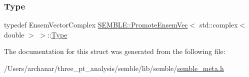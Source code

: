 \mbox{\label{structSEMBLE_1_1PromoteEnsemVec_3_01std_1_1complex_3_01double_01_4_01_4_a515e76ac6ae88273e5df1c2ace1c7046}} 
\subsubsection{\texorpdfstring{Type}{Type}\hspace{0.1cm}{\footnotesize\ttfamily [2/2]}}
{\footnotesize\ttfamily typedef Ensem\+Vector\+Complex \mbox{\hyperlink{structSEMBLE_1_1PromoteEnsemVec}{S\+E\+M\+B\+L\+E\+::\+Promote\+Ensem\+Vec}}$<$ std\+::complex$<$ double $>$ $>$\+::\mbox{\hyperlink{structSEMBLE_1_1PromoteEnsemVec_3_01std_1_1complex_3_01double_01_4_01_4_a515e76ac6ae88273e5df1c2ace1c7046}{Type}}}



The documentation for this struct was generated from the following file\+:\begin{DoxyCompactItemize}
\item 
/\+Users/archanar/three\+\_\+pt\+\_\+analysis/semble/lib/semble/\mbox{\hyperlink{lib_2semble_2semble__meta_8h}{semble\+\_\+meta.\+h}}\end{DoxyCompactItemize}

